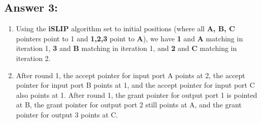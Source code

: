 \documentclass[10pt]{article}
\begin{document}
\subsection*{Answer 3:}
\begin{enumerate}
  \item Using the \textbf{iSLIP} algorithm set to initial positions (where all \textbf{A, B, C} pointers point to 1 and \textbf{1,2,3} point to \textbf{A}), we have \textbf{1} and \textbf{A} matching in iteration 1, \textbf{3} and \textbf{B} matching in iteration 1, and \textbf{2} and \textbf{C} matching in iteration 2.
  \item After round 1, the accept pointer for input port A points at 2, the accept pointer for input port B points at 1, and the accept pointer for input port C also points at 1. After round 1, the grant pointer for output port 1 is pointed at B, the grant pointer for output port 2 still points at A, and the grant pointer for output 3 points at C.
\end{enumerate}
\end{document}
